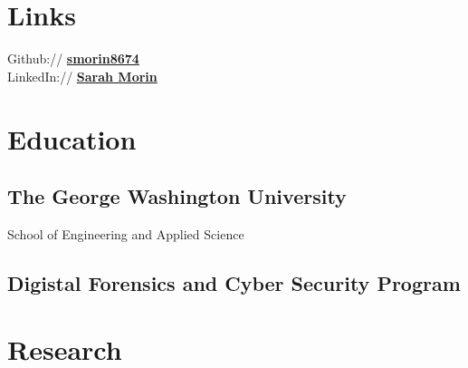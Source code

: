 \documentclass[]{deedy-resume-openfont}
\begin{document}
\begin{minipage}[t]{0.33\textwidth}
        \section{Links}
        Github:// \href{https://github.com/smorin8674}{\bf smorin8674}\\
        LinkedIn://  \href{https://www.linkedin.com/in/sarah-morin-500603165/}{\bf Sarah Morin} \\


\end{minipage} 
\hfill
\begin{minipage}[t]{0.66\textwidth} 



        \section{Education} 
        \subsection{The George Washington University}
        School of Engineering and Applied Science\\
        \sectionsep

        \subsection{Digistal Forensics and Cyber Security Program}
    

        \section{Research}
        \sectionsep


\end{minipage}
\end{document}

